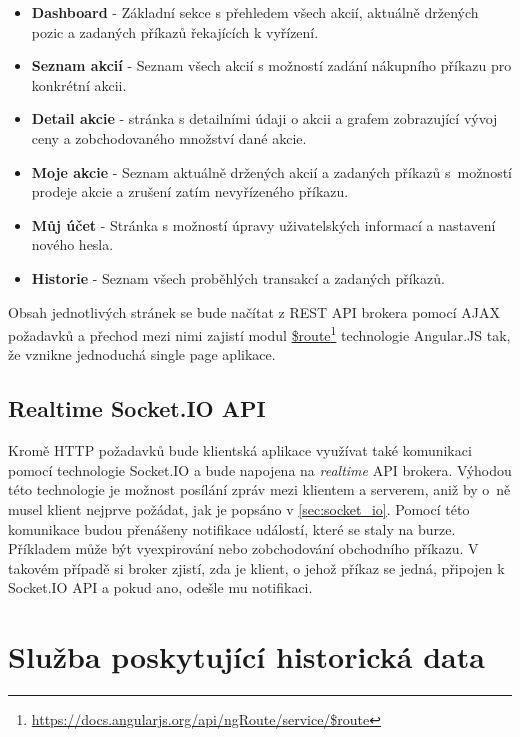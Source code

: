\documentclass[thesis=M,czech]{FITthesis}[2012/06/26]
\newcommand\fnurl[2]{\href{#2}{#1}\footnote{\url{#2}}}
\begin{document}
\begin{itemize}

\item \textbf{Dashboard} - Základní sekce s přehledem všech akcií, aktuálně držených pozic a zadaných příkazů řekajících k vyřízení.

\item \textbf{Seznam akcií} - Seznam všech akcií s možností zadání nákupního příkazu pro konkrétní akcii.

\item \textbf{Detail akcie} - stránka s detailními údaji o akcii a grafem zobrazující vývoj ceny a zobchodovaného množství dané akcie.

\item \textbf{Moje akcie} - Seznam aktuálně držených akcií a zadaných příkazů s~možností prodeje akcie a zrušení zatím nevyřízeného příkazu.

\item \textbf{Můj účet} - Stránka s možností úpravy uživatelských informací a nastavení nového hesla.

\item \textbf{Historie} - Seznam všech proběhlých transakcí a zadaných příkazů.

\end{itemize}

	Obsah jednotlivých stránek se bude načítat z REST API brokera pomocí AJAX požadavků a přechod mezi nimi zajistí modul \fnurl{\$route}{https://docs.angularjs.org/api/ngRoute/service/\$route} technologie Angular.JS tak, že vznikne jednoduchá single page aplikace.
	
\subsection{Realtime Socket.IO API}
	
	Kromě HTTP požadavků bude klientská aplikace využívat také komunikaci pomocí technologie Socket.IO a bude napojena na \textit{realtime} API brokera. Výhodou této technologie je možnost posílání zpráv mezi klientem a serverem, aniž by o~ně musel klient nejprve požádat, jak je popsáno v \ref{sec:socket_io}. Pomocí této komunikace budou přenášeny notifikace událostí, které se staly na burze. Příkladem může být vyexpirování nebo zobchodování obchodního příkazu. V takovém případě si broker zjistí, zda je klient, o jehož příkaz se jedná, připojen k Socket.IO API a pokud ano, odešle mu notifikaci.

\section{Služba poskytující historická data}
\end{document}
